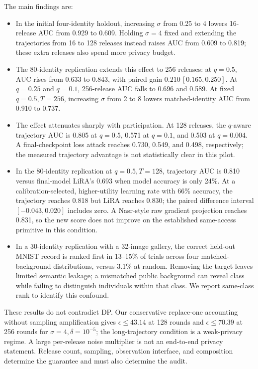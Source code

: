 \documentclass[conference]{IEEEtran}
\begin{document}
The main findings are:
\begin{itemize}
  \item In the initial four-identity holdout, increasing $\sigma$ from 0.25 to 4 lowers 16-release AUC from 0.929 to 0.609. Holding $\sigma=4$ fixed and extending the trajectories from 16 to 128 releases instead raises AUC from 0.609 to 0.819; these extra releases also spend more privacy budget.
  \item The 80-identity replication extends this effect to 256 releases: at $q=0.5$, AUC rises from 0.633 to 0.843, with paired gain $0.210\,[0.165,0.250]$. At $q=0.25$ and $q=0.1$, 256-release AUC falls to 0.696 and 0.589. At fixed $q=0.5,T=256$, increasing $\sigma$ from 2 to 8 lowers matched-identity AUC from 0.910 to 0.737.
  \item The effect attenuates sharply with participation. At 128 releases, the $q$-aware trajectory AUC is 0.805 at $q=0.5$, 0.571 at $q=0.1$, and 0.503 at $q=0.004$. A final-checkpoint loss attack reaches 0.730, 0.549, and 0.498, respectively; the measured trajectory advantage is not statistically clear in this pilot.
  \item In the 80-identity replication at $q=0.5,T=128$, trajectory AUC is 0.810 versus final-model LiRA's 0.693 when model accuracy is only 24\%. At a calibration-selected, higher-utility learning rate with 66\% accuracy, the trajectory reaches 0.818 but LiRA reaches 0.830; the paired difference interval $[-0.043,0.020]$ includes zero. A Nasr-style raw gradient projection reaches 0.831, so the new score does not improve on the established same-access primitive in this condition.
  \item In a 30-identity replication with a 32-image gallery, the correct held-out MNIST record is ranked first in 13--15\% of trials across four matched-background distributions, versus 3.1\% at random. Removing the target leaves limited semantic leakage; a mismatched public background can reveal class while failing to distinguish individuals within that class. We report same-class rank to identify this confound.
\end{itemize}

These results do not contradict DP. Our conservative replace-one accounting without sampling amplification gives $\epsilon\leq 43.14$ at 128 rounds and $\epsilon\leq 70.39$ at 256 rounds for $\sigma=4,\delta=10^{-5}$; the long-trajectory condition is a weak-privacy regime. A large per-release noise multiplier is not an end-to-end privacy statement. Release count, sampling, observation interface, and composition determine the guarantee and must also determine the audit.
\end{document}
